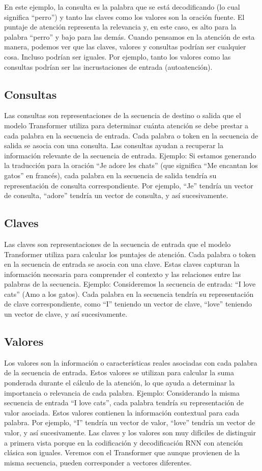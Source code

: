 En este ejemplo, la consulta es la palabra que se está decodificando (lo cual significa ``perro'') y tanto las claves como los valores son la oración fuente. El puntaje de atención representa la relevancia y, en este caso, es alto para la palabra ``perro'' y bajo para las demás. Cuando pensamos en la atención de esta manera, podemos ver que las claves, valores y consultas podrían ser cualquier cosa. Incluso podrían ser iguales. Por ejemplo, tanto los valores como las consultas podrían ser las incrustaciones de entrada (autoatención).


\subsection{Consultas}
Las consultas son representaciones de la secuencia de destino o salida que el modelo Transformer utiliza para determinar cuánta atención se debe prestar a cada palabra en la secuencia de entrada. Cada palabra o token en la secuencia de salida se asocia con una consulta. Las consultas ayudan a recuperar la información relevante de la secuencia de entrada. Ejemplo: Si estamos generando la traducción para la oración ``Je adore les chats'' (que significa ``Me encantan los gatos'' en francés), cada palabra en la secuencia de salida tendría su representación de consulta correspondiente. Por ejemplo, ``Je'' tendría un vector de consulta, ``adore'' tendría un vector de consulta, y así sucesivamente.

\subsection{Claves}
Las claves son representaciones de la secuencia de entrada que el modelo Transformer utiliza para calcular los puntajes de atención. Cada palabra o token en la secuencia de entrada se asocia con una clave. Estas claves capturan la información necesaria para comprender el contexto y las relaciones entre las palabras de la secuencia.
Ejemplo: Consideremos la secuencia de entrada: ``I love cats'' (Amo a los gatos). Cada palabra en la secuencia tendría su representación de clave correspondiente, como ``I'' teniendo un vector de clave, ``love'' teniendo un vector de clave, y así sucesivamente.

\subsection{Valores}
Los valores son la información o características reales asociadas con cada palabra de la secuencia de entrada. Estos valores se utilizan para calcular la suma ponderada durante el cálculo de la atención, lo que ayuda a determinar la importancia o relevancia de cada palabra. Ejemplo: Considerando la misma secuencia de entrada ``I love cats'', cada palabra tendría su representación de valor asociada. Estos valores contienen la información contextual para cada palabra. Por ejemplo, ``I'' tendría un vector de valor, ``love'' tendría un vector de valor, y así sucesivamente.
Las claves y los valores son muy difíciles de distinguir a primera vista porque en la codificación y decodificación RNN con atención clásica son iguales. Veremos con el Transformer que aunque provienen de la misma secuencia, pueden corresponder a vectores diferentes.



